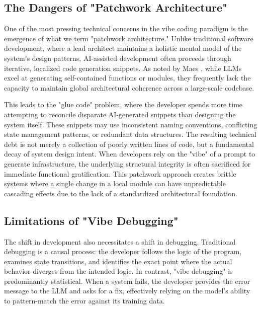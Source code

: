 \documentclass[../main.tex]{subfiles}
\begin{document}
\subsection{The Dangers of "Patchwork Architecture"}

One of the most pressing technical concerns in the vibe coding paradigm is the emergence of what we term "patchwork architecture." Unlike traditional software development, where a lead architect maintains a holistic mental model of the system's design patterns, AI-assisted development often proceeds through iterative, localized code generation snippets. As noted by Maes \cite{maes2025gotchas}, while LLMs excel at generating self-contained functions or modules, they frequently lack the capacity to maintain global architectural coherence across a large-scale codebase.

This leads to the "glue code" problem, where the developer spends more time attempting to reconcile disparate AI-generated snippets than designing the system itself. These snippets may use inconsistent naming conventions, conflicting state management patterns, or redundant data structures. The resulting technical debt is not merely a collection of poorly written lines of code, but a fundamental decay of system design intent. When developers rely on the "vibe" of a prompt to generate infrastructure, the underlying structural integrity is often sacrificed for immediate functional gratification. This patchwork approach creates brittle systems where a single change in a local module can have unpredictable cascading effects due to the lack of a standardized architectural foundation. \cite{prather2024widening}

\subsection{Limitations of "Vibe Debugging"}

The shift in development also necessitates a shift in debugging. Traditional debugging is a causal process: the developer follows the logic of the program, examines state transitions, and identifies the exact point where the actual behavior diverges from the intended logic. In contrast, "vibe debugging" is predominantly statistical. When a system fails, the developer provides the error message to the LLM and asks for a fix, effectively relying on the model's ability to pattern-match the error against its training data.
\end{document}
